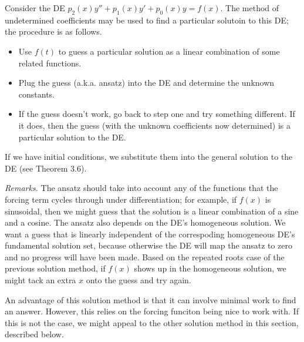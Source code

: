 \documentclass[../m82main.tex]{subfiles}
\begin{document}
\begin{definition}
    Consider the DE $p_2(x)y'' + p_1(x)y' + p_0(x)y = f(x)$.
    The method of undetermined coefficients may be used to find a particular solutoin to this DE; the procedure is as follows.
    \begin{itemize}
        \item Use $f(t)$ to guess a particular solution as a linear combination of some related functions.
        \item Plug the guess (a.k.a. ansatz) into the DE and determine the unknown constants.
        \item If the guess doesn't work, go back to step one and try something different.
        If it does, then the guess (with the unknown coefficients now determined) is a particular solution to the DE.
    \end{itemize}
    If we have initial conditions, we substitute them into the general solution to the DE (see Theorem 3.6).
\end{definition}

\textit{Remarks.}
The ansatz should take into account any of the functions that the forcing term cycles through under differentiation; for example, if $f(x)$ is sinusoidal, then we might guess that the solution is a linear combination of a sine and a cosine.
The ansatz also depends on the DE's homogeneous solution.
We want a guess that is linearly independent of the correspoding homogeneous DE's fundamental solution set, because otherwise the DE will map the ansatz to zero and no progress will have been made.
Based on the repeated roots case of the previous solution method, if $f(x)$ shows up in the homogeneous solution, we might tack an extra $x$ onto the guess and try again.

An advantage of this solution method is that it can involve minimal work to find an answer.
However, this relies on the forcing funciton being nice to work with.
If this is not the case, we might appeal to the other solution method in this section, described below.
\end{document}
